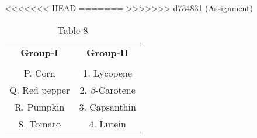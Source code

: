 \begin{table}[htbp]
  \centering
  \caption{Table-8}
<<<<<<< HEAD
  \label{tab:tables/table8.tex}
=======
  \label{table8}
>>>>>>> d734831 (Assignment)
  \begin{tabular}{cc}
  \textbf{Group-I} & \textbf{Group-II} \\ \\
    P. Corn & 1. Lycopene \\
    Q. Red pepper & 2. $\beta$-Carotene \\
    R. Pumpkin & 3. Capsanthin \\
    S. Tomato & 4. Lutein \\
  \end{tabular}
\end{table}